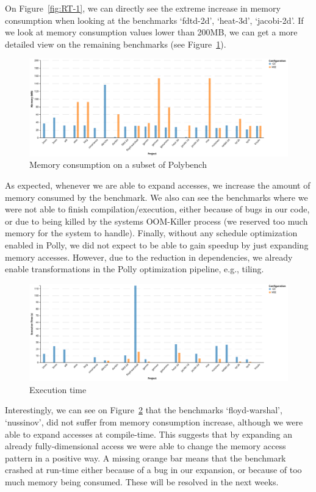 On Figure~\ref{fig:RT-1}, we can directly see the extreme increase in memory consumption when looking at the benchmarks ‘fdtd-2d’, ‘heat-3d’, ‘jacobi-2d’. If we look at memory consumption values lower than 200MB, we can get a more detailed view on the remaining benchmarks (see Figure~\ref{fig:RT-2}).

\begin{figure}
\centering
\includegraphics[angle=90,origin=c,scale=0.5]{gfx/Evaluation/RT-2.png}
\caption{Memory consumption on a subset of Polybench}
\label{fig:RT-2}
\end{figure}

As expected, whenever we are able to expand accesses, we increase the amount of memory consumed by the benchmark. We also can see the benchmarks where we were not able to finish compilation/execution, either because of bugs in our code, or due to being killed by the systems OOM-Killer process (we reserved too much memory for the system to handle). Finally, without any schedule optimization enabled in Polly, we did not expect to be able to gain speedup by just expanding memory accesses. However, due to the reduction in dependencies, we already enable transformations in the Polly optimization pipeline, e.g., tiling.

\begin{figure}
\centering
\includegraphics[angle=90,origin=c,scale=0.5]{gfx/Evaluation/RT-3.png}
\caption{Execution time}
\label{fig:RT-3}
\end{figure}

Interestingly, we can see on Figure~\ref{fig:RT-3} that the benchmarks ‘floyd-warshal’, ‘nussinov’, did not suffer from memory consumption increase, although we were able to expand accesses at compile-time. This suggests that by expanding an already fully-dimensional access we were able to change the memory access pattern in a positive way. A missing orange bar means that the benchmark crashed at run-time either because of a bug in our expansion, or because of too much memory being consumed. These will be resolved in the next weeks.
